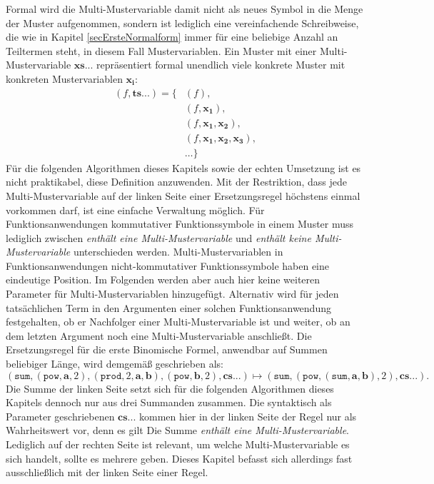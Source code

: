 Formal wird die Multi-Mustervariable damit nicht als neues Symbol in die Menge der Muster aufgenommen, sondern ist lediglich eine vereinfachende Schreibweise, die wie in Kapitel \ref{secErsteNormalform} immer für eine beliebige Anzahl an Teiltermen steht, in diesem Fall Mustervariablen. Ein Muster mit einer Multi-Mustervariable $\mathbf{xs...}$ repräsentiert formal unendlich viele konkrete Muster mit konkreten Mustervariablen $\mathbf{x_i}$:
\begin{equation*}
	\begin{split}
			(f, \mathbf{ts...}) = \{&(f), \\
			&(f, \mathbf{x_1}),\\
			&(f, \mathbf{x_1}, \mathbf{x_2}), \\
			&(f, \mathbf{x_1}, \mathbf{x_2}, \mathbf{x_3}), \\
			&\dots \}    		
	\end{split}
\end{equation*}
Für die folgenden Algorithmen dieses Kapitels sowie der echten Umsetzung ist es nicht praktikabel, diese Definition anzuwenden. Mit der Restriktion, dass jede Multi-Mustervariable auf der linken Seite einer Ersetzungsregel höchstens einmal vorkommen darf, ist eine einfache Verwaltung möglich. Für Funktionsanwendungen kommutativer Funktionssymbole in einem Muster muss lediglich zwischen \textit{enthält eine Multi-Mustervariable} und \textit{enthält keine Multi-Mustervariable} unterschieden werden. Multi-Mustervariablen in Funktionsanwendungen nicht-kommutativer Funktionssymbole haben eine eindeutige Position. Im Folgenden werden aber auch hier keine weiteren Parameter für Multi-Mustervariablen hinzugefügt. Alternativ wird für jeden tatsächlichen Term in den Argumenten einer solchen Funktionsanwendung festgehalten, ob er Nachfolger einer Multi-Mustervariable ist und weiter, ob an dem letzten Argument noch eine Multi-Mustervariable anschließt. 
Die Ersetzungsregel für die erste Binomische Formel, anwendbar auf Summen beliebiger Länge, wird demgemäß  geschrieben als:
$$(\texttt{sum}, (\texttt{pow}, \mathbf a, 2), (\texttt{prod}, 2, \mathbf a, \mathbf b), (\texttt{pow}, \mathbf b, 2), \mathbf{cs...}) \mapsto (\texttt{sum}, (\texttt{pow}, (\texttt{sum}, \mathbf a, \mathbf b), 2), \mathbf{cs...}).$$
Die Summe der linken Seite setzt sich für die folgenden Algorithmen dieses Kapitels dennoch nur aus drei Summanden zusammen. Die syntaktisch als Parameter geschriebenen $\mathbf{cs...}$ kommen hier in der linken Seite der Regel nur als Wahrheitswert vor, denn es gilt \glqq Die Summe \textit{enthält eine Multi-Mustervariable}\grqq{}. Lediglich auf der rechten Seite ist relevant, um welche Multi-Mustervariable es sich handelt, sollte es mehrere geben. Dieses Kapitel befasst sich allerdings fast ausschließlich mit der linken Seite einer Regel.



